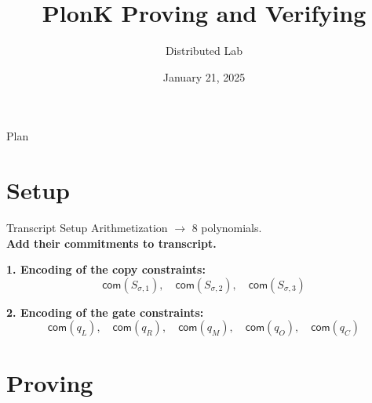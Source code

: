 \documentclass{zkdl-presentation-template}
\title[PlonK Proving and Verifying]{\textbf{PlonK Proving and Verifying}}
\author{Distributed Lab}
\date{January 21, 2025}
\begin{document}

    \begin{frame}{Plan}
        \tableofcontents
    \end{frame}

    \section{Setup}

    \begin{frame}{Transcript Setup}
        Arithmetization $\rightarrow$ 8 polynomials. \\ 
        \textbf{Add their commitments to transcript.}
        \vspace{1em}
        
        \textbf{1. Encoding of the copy constraints:}
        \begin{equation*}
            \mathsf{com}(S_{\sigma,1}), \quad \mathsf{com}(S_{\sigma,2}), \quad \mathsf{com}(S_{\sigma,3})
        \end{equation*}
        
        \textbf{2. Encoding of the gate constraints:}
        \begin{equation*}
            \mathsf{com}(q_L), \quad \mathsf{com}(q_R), \quad \mathsf{com}(q_M), \quad 
            \mathsf{com}(q_O), \quad \mathsf{com}(q_C)
        \end{equation*}
    \end{frame}    

    \section{Proving}
\end{document}
